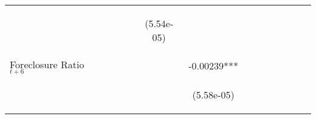 \begin{table}
\begin{center}
{\begin{tabular}{lccccccccccccc}
\vspace{4pt} & \begin{footnotesize}\end{footnotesize} & \begin{footnotesize}\end{footnotesize} & \begin{footnotesize}\end{footnotesize} & \begin{footnotesize}\end{footnotesize} & \begin{footnotesize}(5.54e-05)\end{footnotesize} & \begin{footnotesize}\end{footnotesize} & \begin{footnotesize}\end{footnotesize} & \begin{footnotesize}\end{footnotesize} & \begin{footnotesize}\end{footnotesize} & \begin{footnotesize}\end{footnotesize} & \begin{footnotesize}\end{footnotesize} & \begin{footnotesize}\end{footnotesize} \\
Foreclosure Ratio$_{t+6}$  &    &  &  &  &  & -0.00239*** &  &  &  &  &  &  \\
\vspace{4pt}  & \begin{footnotesize}\end{footnotesize} & \begin{footnotesize}\end{footnotesize} & \begin{footnotesize}\end{footnotesize} & \begin{footnotesize}\end{footnotesize} & \begin{footnotesize}\end{footnotesize} & \begin{footnotesize}(5.58e-05)\end{footnotesize} & \begin{footnotesize}\end{footnotesize} & \begin{footnotesize}\end{footnotesize} & \begin{footnotesize}\end{footnotesize} & \begin{footnotesize}\end{footnotesize} & \begin{footnotesize}\end{footnotesize} & \begin{footnotesize}\end{footnotesize} \\

\end{tabular}}
\end{center}
\end{table}
